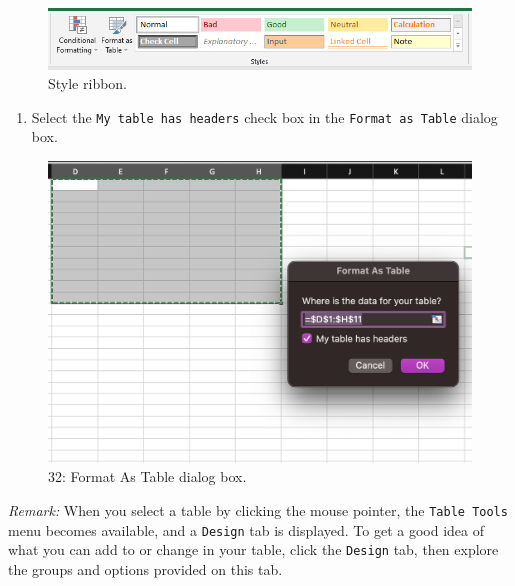 \documentclass[
]{book}
\providecommand{\tightlist}{%
  \setlength{\itemsep}{0pt}\setlength{\parskip}{0pt}}
\begin{document}
\begin{figure}

{\centering \includegraphics[width=0.9\linewidth]{style-pc} 

}

\caption{Style ribbon.}\label{fig:table-style-group}
\end{figure}

\begin{enumerate}
\def\labelenumi{\arabic{enumi}.}
\setcounter{enumi}{2}
\tightlist
\item
  Select the \texttt{My\ table\ has\ headers} check box in the \texttt{Format\ as\ Table} dialog box.
\end{enumerate}

\begin{figure}

{\centering \includegraphics[width=0.7\linewidth]{format-table} 

}

\caption{32: Format As Table dialog box.}\label{fig:format-as-table}
\end{figure}

\emph{Remark:} When you select a table by clicking the mouse pointer, the \texttt{Table\ Tools} menu becomes available, and a \texttt{Design} tab is displayed. To get a good idea of what you can add to or change in your table, click the \texttt{Design} tab, then explore the groups and options provided on this tab.
\end{document}
